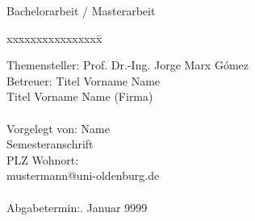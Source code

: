 \documentclass[11pt]{scrartcl}
\begin{document}
\begin{titlepage}
\begin{centering}
		\vspace*{0.5cm}
		\noindent Bachelorarbeit / Masterarbeit

	\end{centering}
  
    \vspace*{1.5cm}
    
    \begin{tabbing}
		xxxxxxxxxxxxxxxx\= \kill
	  
		
		
		\small Themensteller:\> Prof. Dr.-Ing. Jorge Marx Gómez\\
		\small Betreuer:\> Titel Vorname Name\\ 
		\small \> Titel Vorname Name (Firma)\\\\
	
		\small Vorgelegt von: \>Name\\
		\small \>Semesteranschrift\\
		\small \>PLZ Wohnort:\\
		\small \>mustermann@uni-oldenburg.de\\\\
	
		\small Abgabetermin:. Januar 9999
		
		



	\end{tabbing}
\end{titlepage}
\end{document}
